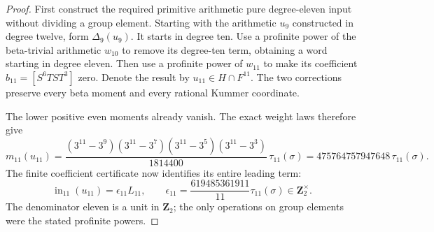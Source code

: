 \begin{proof}
First construct the required primitive arithmetic pure
degree-eleven input without dividing a group element.
Starting with the arithmetic $u_9$ constructed in degree
twelve, form $\Delta_9(u_9)$. It starts in degree ten.
Use a profinite power of the beta-trivial arithmetic $w_{10}$
to remove its degree-ten term, obtaining a word starting in
degree eleven. Then use a profinite power of $w_{11}$ to make
its coefficient $b_{11}=[S^6TST^3]$ zero. Denote the result
by $u_{11}\in H\cap F^{11}$. The two corrections preserve
every beta moment and every rational Kummer coordinate.

The lower positive even moments already vanish. The exact
weight laws therefore give
\[
 m_{11}(u_{11})=
 \frac{(3^{11}-3^9)(3^{11}-3^7)(3^{11}-3^5)(3^{11}-3^3)}
             {1814400}\,\tau_{11}(\sigma)
 =475764757947648\,\tau_{11}(\sigma).
\]
The finite coefficient certificate now identifies its entire
leading term:
\begin{equation}\label{eq:fr-fourteen-pure-eleven-input}
 \operatorname{in}_{11}(u_{11})=\epsilon_{11}L_{11},
 \qquad
 \epsilon_{11}=\frac{619485361911}{11}\tau_{11}(\sigma)
                  \in\mathbf Z_2^\times.
\end{equation}
The denominator eleven is a unit in $\mathbf Z_2$; the only
operations on group elements were the stated profinite powers.


\end{proof}

